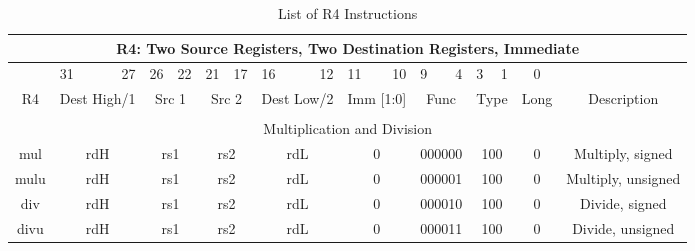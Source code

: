 \documentclass{article}
\begin{document}
    \begin{center}
    \begin{longtable}{|c|l|r|l|r|l|r|l|r|l|r|l|r|l|r|c|c|}
    \caption{List of R4 Instructions}
    \label{table:r4_instr} \\

                    \multicolumn{17}{c}{R4: Two Source Registers, Two Destination Registers, Immediate} \\
    \hline      &   \multicolumn{1}{l}{31}  &   27      &   \multicolumn{1}{l}{26}  &   22  &   \multicolumn{1}{l}{21}  &   17      &   \multicolumn{1}{l}{16}  &   12      &   \multicolumn{1}{l}{11}  &   10  &   \multicolumn{1}{l}{9}   &   4   &   \multicolumn{1}{l}{3}   &   1   &   0       & \\
    \hline R4   &   \multicolumn{2}{|c|}{Dest High/1}   &   \multicolumn{2}{|c|}{Src 1}     &   \multicolumn{2}{|c|}{Src 2}         &   \multicolumn{2}{|c|}{Dest Low/2}    &   \multicolumn{2}{|c|}{Imm [1:0]} &   \multicolumn{2}{|c|}{Func}      &   \multicolumn{2}{|c|}{Type}  &   Long    &   Description \\


    \hline          \multicolumn{17}{|c|}{} \\
    
                    \multicolumn{17}{|c|}{Multiplication and Division} \\
    \hline mul  &   \multicolumn{2}{|c|}{rdH}           &   \multicolumn{2}{|c|}{rs1}       &   \multicolumn{2}{|c|}{rs2}       &   \multicolumn{2}{|c|}{rdL}   &   \multicolumn{2}{|c|}{0} &   \multicolumn{2}{|c|}{000000}    &   \multicolumn{2}{|c|}{100}   &   0   &   Multiply, signed \\
    \hline mulu &   \multicolumn{2}{|c|}{rdH}           &   \multicolumn{2}{|c|}{rs1}       &   \multicolumn{2}{|c|}{rs2}       &   \multicolumn{2}{|c|}{rdL}   &   \multicolumn{2}{|c|}{0} &   \multicolumn{2}{|c|}{000001}    &   \multicolumn{2}{|c|}{100}   &   0   &   Multiply, unsigned \\
    \hline div  &   \multicolumn{2}{|c|}{rdH}           &   \multicolumn{2}{|c|}{rs1}       &   \multicolumn{2}{|c|}{rs2}       &   \multicolumn{2}{|c|}{rdL}   &   \multicolumn{2}{|c|}{0} &   \multicolumn{2}{|c|}{000010}    &   \multicolumn{2}{|c|}{100}   &   0   &   Divide, signed \\
    \hline divu &   \multicolumn{2}{|c|}{rdH}           &   \multicolumn{2}{|c|}{rs1}       &   \multicolumn{2}{|c|}{rs2}       &   \multicolumn{2}{|c|}{rdL}   &   \multicolumn{2}{|c|}{0} &   \multicolumn{2}{|c|}{000011}    &   \multicolumn{2}{|c|}{100}   &   0   &   Divide, unsigned \\
        
            
    \hline
    \end{longtable}
    \end{center}
    
\end{document}
